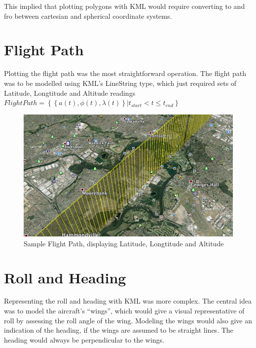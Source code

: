 This implied that plotting polygons with KML would require converting to and fro between cartesian and spherical coordinate systems.

\section{Flight Path}

Plotting the flight path was the most straightforward operation. The flight path was to be modelled using KML's LineString type, which just required sets of Latitude, Longtitude and Altitude readings\\

$FlightPath = \left\{ \left\{a(t),\phi(t),\lambda(t) \right\} | t_{start} < t \leq t_{end} \right\}$ \\

\begin{figure}[h]
\caption{Sample Flight Path, displaying Latitude, Longtitude and Altitude}
\centering
  \includegraphics[scale=0.5]{gfx/flight-path-sample.png}
\end{figure}

\section{Roll and Heading}

Representing the roll and heading with KML was more complex. The central idea was to model the aircraft's ``wings'', which would give a visual representative of roll by assessing the roll angle of the wing. Modeling the wings would also give an indication of the heading, if the wings are assumed to be straight lines. The heading would always be perpendicular to the wings.\\

